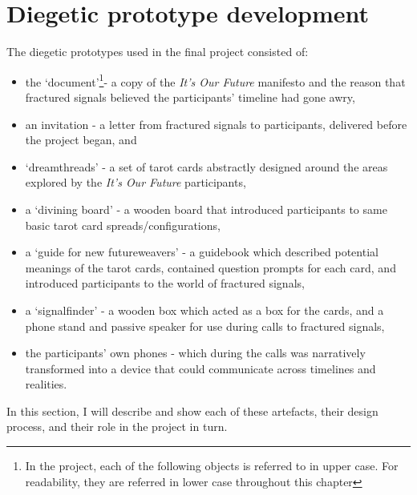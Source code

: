 \section{Diegetic prototype development}
\label{sec:8-4-fractured}
The diegetic prototypes used in the final project consisted of:
\begin{itemize}
    \item the `document'\footnote{In the project, each of the following objects is referred to in upper case. For readability, they are referred in lower case throughout this chapter}- a copy of the \emph{It's Our Future} manifesto and the reason that fractured signals believed the participants' timeline had gone awry,
    \item an invitation - a letter from fractured signals to participants, delivered before the project began, and
    \item `dreamthreads' - a set of tarot cards abstractly designed around the areas explored by the \emph{It's Our Future} participants,
    \item a `divining board' - a wooden board that introduced participants to same basic tarot card spreads/configurations,
    \item a `guide for new futureweavers' - a guidebook which described potential meanings of the tarot cards, contained question prompts for each card, and introduced participants to the world of fractured signals,
    \item a `signalfinder' - a wooden box which acted as a box for the cards, and a phone stand and passive speaker for use during calls to fractured signals,
    \item the participants' own phones - which during the calls was narratively transformed into a device that could communicate across timelines and realities. 
\end{itemize}
In this section, I will describe and show each of these artefacts, their design process, and their role in the project in turn. 

